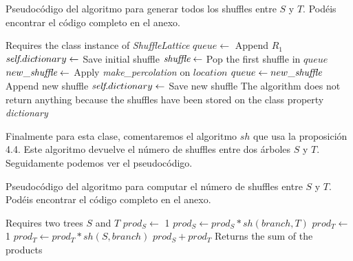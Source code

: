 \documentclass[../main.tex]{subfiles}
\begin{document}
\begin{algorithm}
    \caption{Pseudoc\'odigo del algoritmo para generar todos los shuffles entre $S$ y $T$. Pod\'eis encontrar el c\'odigo completo en el anexo.}
    \begin{algorithmic}[1]
        \Require Requires the class instance of \emph{ShuffleLattice}
        \State $queue\leftarrow$ Append $R_1$ 
        \State $\emph{self}.dictionary\leftarrow$ Save initial shuffle
        \State $\emph{shuffle} \leftarrow$ Pop the first shuffle in $queue$
        \State $new\_\emph{shuffle} \leftarrow$ Apply \emph{make\_percolation} on $location$
        \State $queue\leftarrow new\_\emph{shuffle}$ Append new shuffle
        \State $\emph{self}.dictionary\leftarrow$ Save new shuffle
        \EndIf
        \EndFor
        \EndWhile
        \EndFunction
        \Ensure The algorithm does not return anything because the shuffles have been stored on the class property \emph{dictionary}
    \end{algorithmic}
\end{algorithm}

Finalmente para esta clase, comentaremos el algoritmo $sh$ que usa la proposici\'on 4.4. Este algoritmo devuelve el n\'umero de shuffles entre dos \'arboles $S$ y $T$. Seguidamente podemos ver el pseudoc\'odigo.
\begin{algorithm}
    \caption{Pseudoc\'odigo del algoritmo para computar el n\'umero de shuffles entre $S$ y $T$. Pod\'eis encontrar el c\'odigo completo en el anexo.}
    \begin{algorithmic}[1]
        \Require Requires two trees $S$ and $T$
        \State{}
        \EndIf
        \State{}
        \EndIf
        \State $prod_S\leftarrow$ 1
        \State $prod_S \leftarrow prod_S * sh(branch, T)$ 
        \EndFor
        \State $prod_T\leftarrow$ 1
        \State $prod_T \leftarrow prod_T * sh(S, branch)$ 
        \EndFor
        \State\Return $prod_S+prod_T$
        \EndFunction
        \Ensure Returns the sum of the products
    \end{algorithmic}
\end{algorithm}
\newpage
\end{document}
